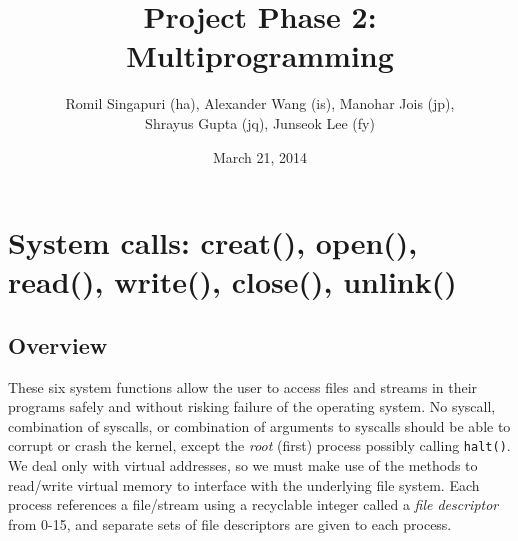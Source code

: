 \documentclass{article}
\title{Project Phase 2: Multiprogramming}
\author{Romil Singapuri (ha), Alexander Wang (is), Manohar Jois (jp),
\\Shrayus Gupta (jq), Junseok Lee (fy)}
\date{March 21, 2014}
\begin{document}
\maketitle

\section{System calls: creat(), open(), read(), write(), close(), unlink()}
\subsection{Overview}
These six system functions allow the user to access files and streams in their programs safely and without risking failure of the operating system. No syscall, combination of syscalls, or combination of arguments to syscalls should be able to corrupt or crash the kernel, except the \textit{root} (first) process possibly calling \texttt{halt()}. We deal only with virtual addresses, so we must make use of the methods to read/write virtual memory to interface with the underlying file system. Each process references a file/stream using a recyclable integer called a \textit{file descriptor} from 0-15, and separate sets of file descriptors are given to each process.
\end{document}
